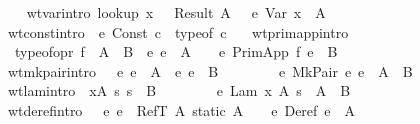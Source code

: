 \begin{isabellebody}
\ \ \isanewline
\ \ wt{\isacharunderscore}var{\isacharbrackleft}intro{\isacharbang}{\isacharbrackright}{\isacharcolon}\ {\isachardoublequoteopen}lookup\ x\ {\isasymGamma}\ {\isacharequal}\ Result\ A\ {\isasymLongrightarrow}\ {\isasymGamma}\ {\isasymturnstile}\isactrlisub e\ Var\ x\ {\isacharcolon}\ A{\isachardoublequoteclose}\ {\isacharbar}\isanewline
\ \ wt{\isacharunderscore}const{\isacharbrackleft}intro{\isacharbang}{\isacharbrackright}{\isacharcolon}\ {\isachardoublequoteopen}{\isasymGamma}\ {\isasymturnstile}\isactrlisub e\ Const\ c\ {\isacharcolon}\ typeof\ c{\isachardoublequoteclose}\ {\isacharbar}\isanewline
\ \ wt{\isacharunderscore}primapp{\isacharbrackleft}intro{\isacharbang}{\isacharbrackright}{\isacharcolon}\isanewline
\ \ {\isachardoublequoteopen}{\isasymlbrakk}\ typeof{\isacharunderscore}opr\ f\ {\isacharequal}\ A\ {\isasymrightarrow}\ B{\isacharsemicolon}\ {\isasymGamma}\ {\isasymturnstile}\isactrlisub e\ e\ {\isacharcolon}\ A\ {\isasymrbrakk}\ {\isasymLongrightarrow}\ {\isasymGamma}\ {\isasymturnstile}\isactrlisub e\ PrimApp\ f\ e\ {\isacharcolon}\ B{\isachardoublequoteclose}\ {\isacharbar}\isanewline
\ \ wt{\isacharunderscore}mkpair{\isacharbrackleft}intro{\isacharbang}{\isacharbrackright}{\isacharcolon}\ {\isachardoublequoteopen}{\isasymlbrakk}\ {\isasymGamma}\ {\isasymturnstile}\isactrlisub e\ e{}\ {\isacharcolon}\ A{\isacharsemicolon}\ {\isasymGamma}\ {\isasymturnstile}\isactrlisub e\ e{}\ {\isacharcolon}\ B\ {\isasymrbrakk}\ {\isasymLongrightarrow}\isanewline
\ \ \ \ \ {\isasymGamma}\ {\isasymturnstile}\isactrlisub e\ MkPair\ e{}\ e{}\ {\isacharcolon}\ A\ {\isasymtimes}\ B{\isachardoublequoteclose}\ {\isacharbar}\isanewline
\ \ wt{\isacharunderscore}lam{\isacharbrackleft}intro{\isacharbang}{\isacharbrackright}{\isacharcolon}\ {\isachardoublequoteopen}{\isasymlbrakk}\ {\isacharparenleft}x{\isacharcomma}A{\isacharparenright}{\isacharhash}{\isasymGamma}\ {\isasymturnstile}\isactrlisub s\ s\ {\isacharcolon}\ B\ {\isasymrbrakk}\ {\isasymLongrightarrow}\isanewline
\ \ \ \ \ {\isasymGamma}\ {\isasymturnstile}\isactrlisub e\ Lam\ x\ A\ s\ {\isacharcolon}\ {\isacharparenleft}A\ {\isasymrightarrow}\ B{\isacharparenright}{\isachardoublequoteclose}\ {\isacharbar}\isanewline
\ \ wt{\isacharunderscore}deref{\isacharbrackleft}intro{\isacharbang}{\isacharbrackright}{\isacharcolon}\ {\isachardoublequoteopen}{\isasymlbrakk}\ {\isasymGamma}\ {\isasymturnstile}\isactrlisub e\ e\ {\isacharcolon}\ RefT\ A{\isacharsemicolon}\ static\ A\ {\isasymrbrakk}\ {\isasymLongrightarrow}\ {\isasymGamma}\ {\isasymturnstile}\isactrlisub e\ Deref\ e\ {\isacharcolon}\ A{\isachardoublequoteclose}\ {\isacharbar}\isanewline

\end{isabellebody}
